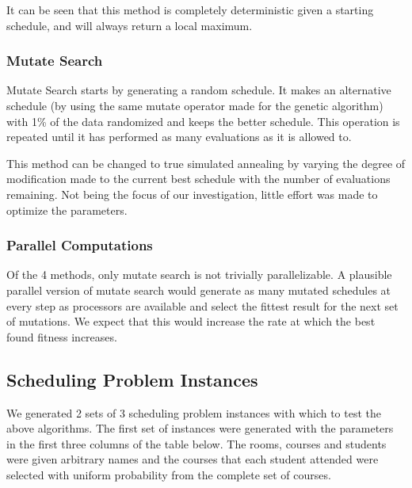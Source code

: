 \documentclass[letterpaper]{article}
\begin{document}
      It can be seen that this method is completely deterministic given a starting schedule,
      and will always return a local maximum.

    \subsubsection{Mutate Search}
      Mutate Search starts by generating a random schedule. It makes an alternative schedule
      (by using the same mutate operator made for the genetic algorithm) with 1\% of the
      data randomized and keeps the better schedule. This operation is
      repeated until it has performed as many evaluations as it is allowed to.
      
      This method can be changed to true simulated annealing by varying the degree of
      modification made to the current best schedule with the number of evaluations
      remaining. Not being the focus of our investigation, little effort was made to 
      optimize the parameters. 
      
    \subsubsection{Parallel Computations}
      Of the 4 methods, only mutate search is not trivially parallelizable. A plausible 
      parallel version of mutate search would generate as many mutated schedules at 
      every step as processors are available and select the fittest result for the next 
      set of mutations. We expect that this would increase the rate at which the best 
      found fitness increases.
      
  \subsection{Scheduling Problem Instances}
    We generated 2 sets of 3 scheduling problem instances with which to test the 
    above algorithms. The first set of instances were generated with the parameters 
    in the first three columns of the table below. The rooms, courses and students 
    were given arbitrary names and the courses that each student attended were 
    selected with uniform probability from the complete set of courses.
      
\end{document}
